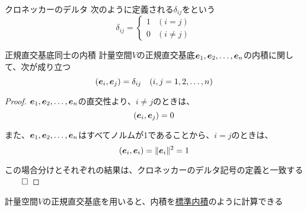 \documentclass[../../../topic_linear-algebra]{subfiles}
\begin{document}
\begin{definition}{クロネッカーのデルタ}
  次のように定義される$\delta_{ij}$をという
  \begin{equation*}
    \delta_{ij} =
    \begin{cases}
      1 & (i=j)      \\
      0 & (i \neq j)
    \end{cases}
  \end{equation*}
\end{definition}

\begin{theorem}{正規直交基底同士の内積}
  計量空間$V$の正規直交基底$\vb*{e}_1, \vb*{e}_2, \ldots, \vb*{e}_n$の内積に関して、次が成り立つ
  \begin{equation*}
    (\vb*{e}_i, \vb*{e}_j) = \delta_{ij} \quad (i,j=1,2,\ldots,n)
  \end{equation*}
\end{theorem}

\begin{proof}
  $\vb*{e}_1, \vb*{e}_2, \ldots, \vb*{e}_n$の直交性より、$i \neq j$のときは、
  \begin{equation*}
    (\vb*{e}_i, \vb*{e}_j) = 0
  \end{equation*}

  また、$\vb*{e}_1, \vb*{e}_2, \ldots, \vb*{e}_n$はすべてノルムが1であることから、$i=j$のときは、
  \begin{equation*}
    (\vb*{e}_i, \vb*{e}_i) = \|\vb*{e}_i\|^2 = 1
  \end{equation*}

  この場合分けとそれぞれの結果は、クロネッカーのデルタ記号の定義と一致する $\qed$
\end{proof}

\sectionline

計量空間$V$の正規直交基底を用いると、内積を\hyperref[def:standard-inner-product-Cn]{標準内積}のように計算できる

\br
\end{document}
